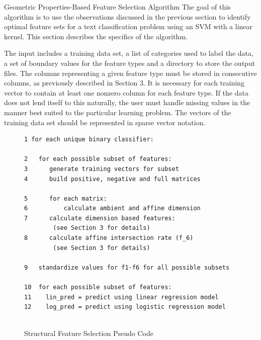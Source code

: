\documentclass{llncs}
\begin{document}
\begin{section}{Geometric Properties-Based Feature Selection Algorithm}
The goal of this algorithm is to use the observations discussed in the previous section to identify optimal feature sets for a text classification problem using an SVM with a linear kernel. This section describes the specifics of the algorithm.


The input includes a training data set, a list of categories used to label the data, a set of boundary values for the feature types and a directory to store the output files. The columns representing a given feature type must be stored in consecutive columns, as  previously described in Section 3. It is necessary for each training vector to contain at least one nonzero column for each feature type. If the data does not lend itself to this naturally, the user must handle missing values in the manner best suited to the particular learning problem. The vectors of the training data set should be represented in sparse vector notation.

\begin{figure}[h]
\caption{Structural Feature Selection Pseudo Code}
\begin{lstlisting}
1 for each unique binary classifier:
			
2   for each possible subset of features:
3	   generate training vectors for subset
4	   build positive, negative and full matrices
		
5	   for each matrix:
6		   calculate ambient and affine dimension
7	   calculate dimension based features:
		(see Section 3 for details)
8	   calculate affine intersection rate (f_6)
		(see Section 3 for details)
		
9 	standardize values for f1-f6 for all possible subsets
	
10  for each possible subset of features:
11	  lin_pred = predict using linear regression model
12	  log_pred = predict using logistic regression model


\end{lstlisting}
\end{figure}
\end{section}
\end{document}

